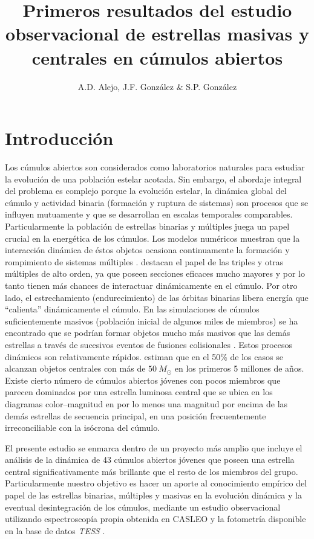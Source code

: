 \documentclass[baaa]{baaa}
\title{Primeros resultados del estudio observacional de estrellas masivas y centrales en cúmulos abiertos}
\author{
A.D. Alejo\inst{1,2},
J.F. González\inst{1,2}
\&
S.P. González\inst{1}
}
\institute{
Facultad de Ciencias Exactas, Físicas y Naturales, UNSJ, Argentina
\and
Instituto de Ciencias Astronómicas, de la Tierra y del Espacio, CONICET--UNSJ, Argentina
}
\begin{document}
\maketitle
\section{Introducci\'on}
Los cúmulos abiertos son considerados como laboratorios naturales para estudiar la evolución de una población estelar acotada. Sin embargo, el abordaje integral del problema es complejo porque la evolución estelar, la dinámica global del cúmulo y actividad binaria (formación y ruptura de sistemas) son procesos que se influyen mutuamente y que se desarrollan en escalas temporales comparables.
Particularmente la población de estrellas binarias y múltiples juega un papel crucial en la energética de los cúmulos. Los modelos numéricos muestran que la interacción dinámica de éstos objetos ocasiona continuamente la formación y rompimiento de sistemas múltiples \citep{2001MNRAS.321..199P,2004MNRAS.351..473P}. \citet{2012MNRAS.425.2369L,2013MNRAS.432.2474L} destacan el papel de las triples y otras múltiples de alto orden, ya que poseen secciones eficaces mucho mayores y por lo tanto tienen más chances de interactuar dinámicamente en el cúmulo. Por otro lado, el estrechamiento (endurecimiento) de las órbitas binarias libera energía que “calienta” dinámicamente el cúmulo. En las simulaciones de cúmulos suficientemente masivos (población inicial de algunos miles de miembros) se ha encontrado que se podrían formar objetos mucho más masivos que las demás estrellas a través de sucesivos eventos de fusiones colisionales \citep{2011MNRAS.415.1179M,2018MNRAS.481..153O,2022MNRAS.509.3724R}. Estos procesos dinámicos son relativamente rápidos. \citet{2018MNRAS.481..153O} estiman que en el 50\% de los casos se alcanzan objetos centrales con más de $50~M_\odot$ en los primeros 5 millones de años. Existe cierto número de cúmulos abiertos jóvenes con pocos miembros que parecen dominados por una estrella luminosa central que se ubica en los diagramas color--magnitud en por lo menos una magnitud por encima de las demás estrellas de secuencia principal, en una posición frecuentemente irreconciliable con la isócrona del cúmulo. 

El presente estudio se enmarca dentro de un proyecto más amplio que incluye el análisis de la dinámica de 43 cúmulos abiertos jóvenes que poseen una estrella central significativamente más brillante que el resto de los miembros del grupo. Particularmente nuestro objetivo es hacer un aporte al conocimiento empírico del papel de las estrellas binarias, múltiples y masivas en la evolución dinámica y la eventual desintegración de los cúmulos, mediante un estudio observacional utilizando espectroscopía propia obtenida en CASLEO y la fotometría disponible en la base de datos {\sl TESS} \citep{2015JATIS...1a4003R}.
\end{document}

